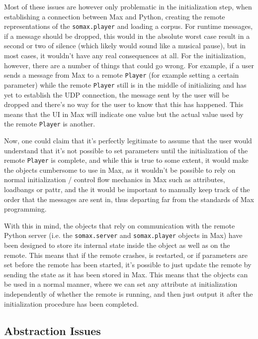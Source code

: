 Most of these issues are however only problematic in the initialization step, when establishing a connection between Max and Python, creating the remote representations of the \texttt{somax.player} and loading a corpus. For runtime messages, if a message should be dropped, this would in the absolute worst case result in a second or two of silence (which likely would sound like a musical pause), but in most cases, it wouldn't have any real consequences at all. For the initialization, however, there are a number of things that could go wrong. For example, if a user sends a message from Max to a remote \texttt{Player} (for example setting a certain parameter) while the remote \texttt{Player} still is in the middle of initializing and has yet to establish the UDP connection, the message sent by the user will be dropped and there's no way for the user to know that this has happened. This means that the UI in Max will indicate one value but the actual value used by the remote \texttt{Player} is another. 

Now, one could claim that it's perfectly legitimate to assume that the user would understand that it's not possible to set parameters until the initialization of the remote \texttt{Player} is complete, and while this is true to some extent, it would make the objects cumbersome to use in Max, as it wouldn't be possible to rely on normal initialization / control flow mechanics in Max such as attributes, loadbangs or pattr, and the it would be important to manually keep track of the order that the messages are sent in, thus departing far from the standards of Max programming.

With this in mind, the objects that rely on communication with the remote Python server (i.e. the \texttt{somax.server} and \texttt{somax.player} objects in Max) have been designed to store its internal state inside the object as well as on the remote. This means that if the remote crashes, is restarted, or if parameters are set before the remote has been started, it's possible to just update the remote by sending the state as it has been stored in Max. This means that the objects can be used in a normal manner, where we can set any attribute at initialization independently of whether the remote is running, and then just output it after the initialization procedure has been completed. 


\subsection{Abstraction Issues}\label{ssec:3-abstractions}

